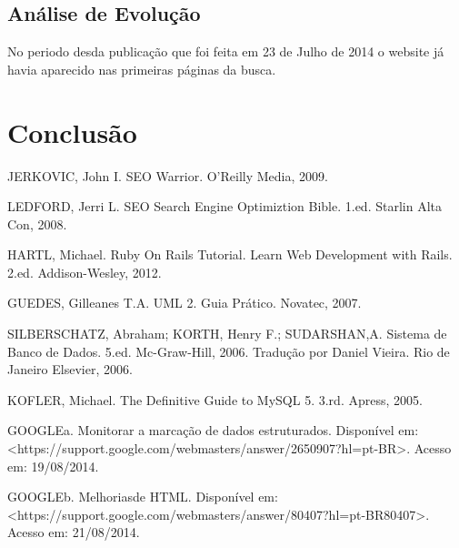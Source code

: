 \documentclass[
	12pt,				%
	openright,			%
	twoside,			%
	a4paper,			%
	english,			%
	french,				%
	spanish,			%
	brazil				%
	]{abntex2}
\begin{document}
\section{Análise de Evolução}

No periodo desda publicação que foi feita em 23 de Julho de 2014 o website já havia aparecido nas primeiras páginas da busca.



\chapter*[Conclusão]{Conclusão}


\postextual

% 

JERKOVIC, John I. SEO Warrior. O'Reilly Media, 2009.

LEDFORD, Jerri L. SEO Search Engine Optimiztion Bible. 1.ed. Starlin Alta Con, 2008.

HARTL, Michael. Ruby On Rails Tutorial. Learn Web Development with Rails. 2.ed. Addison-Wesley, 2012.

GUEDES, Gilleanes T.A. UML 2. Guia Prático. Novatec, 2007.

SILBERSCHATZ, Abraham; KORTH, Henry F.; SUDARSHAN,A. Sistema de Banco de Dados. 5.ed. Mc-Graw-Hill, 2006. Tradução por Daniel Vieira. Rio de Janeiro Elsevier, 2006.

KOFLER, Michael. The Definitive Guide to MySQL 5. 3.rd. Apress, 2005.

GOOGLEa. Monitorar a marcação de dados estruturados. Disponível em: <https://support.google.com/webmasters/answer/2650907?hl=pt-BR>. Acesso  em: 19/08/2014.

GOOGLEb. Melhoriasde HTML. Disponível em: <https://support.google.com/webmasters/answer/80407?hl=pt-BR80407>. Acesso em: 21/08/2014.
\end{document}
